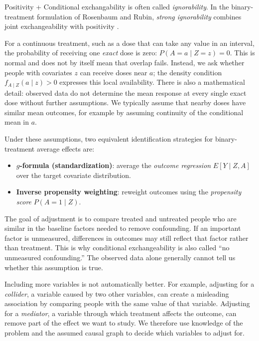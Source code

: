\documentclass[11pt,twoside]{article}
\begin{document}
Positivity + Conditional exchangability is often called \emph{ignorability}. In the binary-treatment formulation of Rosenbaum and Rubin, \emph{strong ignorability} combines joint exchangeability with positivity \cite{rosenbaum1983central}.

\begin{remark}
For a continuous treatment, such as a dose that can take any value in an interval, the probability of receiving one \emph{exact} dose is zero: $P(A=a\mid Z=z)=0$. This is normal and does not by itself mean that overlap fails. Instead, we ask whether people with covariates $z$ can receive doses near $a$; the density condition $f_{A\mid Z}(a\mid z)>0$ expresses this local availability. There is also a mathematical detail: observed data do not determine the mean response at every single exact dose without further assumptions. We typically assume that nearby doses have similar mean outcomes, for example by assuming continuity of the conditional mean in $a$.
\end{remark}

Under these assumptions, two equivalent identification strategies for binary-treatment average effects are:
\begin{itemize}
    \item \textbf{$g$-formula (standardization)}: average the \emph{outcome regression} $E[Y\mid Z,A]$ over the target covariate distribution.
    \item \textbf{Inverse propensity weighting}: reweight outcomes using the \emph{propensity score} $P(A=1\mid Z)$.
\end{itemize}

\begin{remark}
    The goal of adjustment is to compare treated and untreated people who are similar in the baseline factors needed to remove confounding. If an important factor is unmeasured, differences in outcomes may still reflect that factor rather than treatment. This is why conditional exchangeability is also called ``no unmeasured confounding.'' The observed data alone generally cannot tell us whether this assumption is true.

Including more variables is not automatically better. For example, adjusting for a \emph{collider}, a variable caused by two other variables, can create a misleading association by comparing people with the same value of that variable. Adjusting for a \emph{mediator}, a variable through which treatment affects the outcome, can remove part of the effect we want to study. We therefore use knowledge of the problem and the assumed causal graph to decide which variables to adjust for.
\end{remark}
\end{document}
